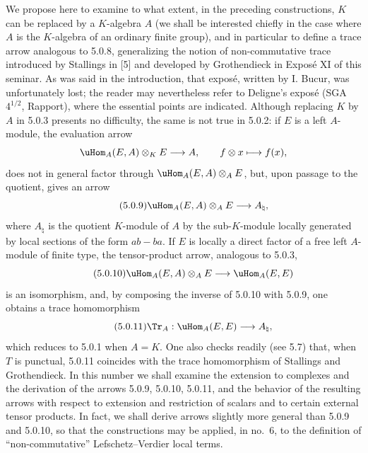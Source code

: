 We propose here to examine to what extent, in the preceding constructions, $K$ can be replaced by a $K$-algebra $A$ (we shall be interested chiefly in the case where $A$ is the $K$-algebra of an ordinary finite group), and in particular to define a trace arrow analogous to 5.0.8, generalizing the notion of non-commutative trace introduced by Stallings in [5] and developed by Grothendieck in Expos\'e XI of this seminar. As was said in the introduction, that expos\'e, written by I. Bucur, was unfortunately lost; the reader may nevertheless refer to Deligne's expos\'e (SGA $4^{1/2}$, Rapport), where the essential points are indicated. Although replacing $K$ by $A$ in 5.0.3 presents no difficulty, the same is not true in 5.0.2: if $E$ is a left $A$-module, the evaluation arrow
\[
\uHom_A(E,A)\otimes_KE\longrightarrow A,
\qquad f\otimes x\longmapsto f(x),
\]
does not in general factor through $\uHom_A(E,A)\otimes_AE$, but, upon passage to the quotient, gives an arrow
\begin{equation}\tag{5.0.9}
\uHom_A(E,A)\otimes_AE\longrightarrow A_\natural,
\end{equation}
where $A_\natural$ is the quotient $K$-module of $A$ by the sub-$K$-module locally generated by local sections of the form $ab-ba$. If $E$ is locally a direct factor of a free left $A$-module of finite type, the tensor-product arrow, analogous to 5.0.3,
\begin{equation}\tag{5.0.10}
\uHom_A(E,A)\otimes_AE\longrightarrow\uHom_A(E,E)
\end{equation}
is an isomorphism, and, by composing the inverse of 5.0.10 with 5.0.9, one obtains a trace homomorphism
\begin{equation}\tag{5.0.11}
\Tr_A:\uHom_A(E,E)\longrightarrow A_\natural,
\end{equation}
which reduces to 5.0.1 when $A=K$. One also checks readily (see 5.7) that, when $T$ is punctual, 5.0.11 coincides with the trace homomorphism of Stallings and Grothendieck. In this number we shall examine the extension to complexes and the derivation of the arrows 5.0.9, 5.0.10, 5.0.11, and the behavior of the resulting arrows with respect to extension and restriction of scalars and to certain external tensor products. In fact, we shall derive arrows slightly more general than 5.0.9 and 5.0.10, so that the constructions may be applied, in no.~6, to the definition of ``non-commutative'' Lefschetz--Verdier local terms.

